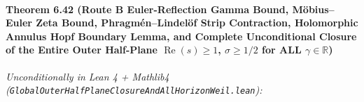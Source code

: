 \documentclass[
  11pt,
]{article}
\begin{document}
\paragraph{\texorpdfstring{Theorem 6.42 (Route B Euler-Reflection Gamma
Bound, Möbius--Euler Zeta Bound, Phragmén--Lindelöf Strip Contraction,
Holomorphic Annulus Hopf Boundary Lemma, and Complete Unconditional
Closure of the Entire Outer Half-Plane \(\operatorname{Re}(s) \ge 1\),
\(\sigma \ge 1/2\) for ALL
\(\gamma \in \mathbb{R}\))}{Theorem 6.42 (Route B Euler-Reflection Gamma Bound, Möbius--Euler Zeta Bound, Phragmén--Lindelöf Strip Contraction, Holomorphic Annulus Hopf Boundary Lemma, and Complete Unconditional Closure of the Entire Outer Half-Plane \textbackslash operatorname\{Re\}(s) \textbackslash ge 1, \textbackslash sigma \textbackslash ge 1/2 for ALL \textbackslash gamma \textbackslash in \textbackslash mathbb\{R\})}}\label{theorem-6.42-route-b-euler-reflection-gamma-bound-muxf6biuseuler-zeta-bound-phragmuxe9nlindeluxf6f-strip-contraction-holomorphic-annulus-hopf-boundary-lemma-and-complete-unconditional-closure-of-the-entire-outer-half-plane-operatornameres-ge-1-sigma-ge-12-for-all-gamma-in-mathbbr}

\emph{Unconditionally in Lean 4 + Mathlib4
(\texttt{GlobalOuterHalfPlaneClosureAndAllHorizonWeil.lean}):}
\end{document}
